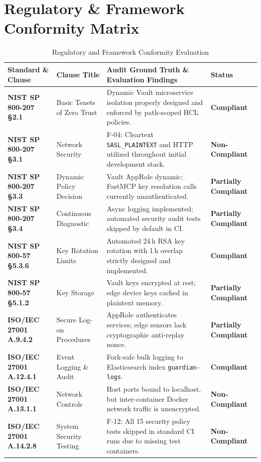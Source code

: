 \documentclass[10pt,a4paper]{report}
\begin{document}
\section{Regulatory \& Framework Conformity Matrix}

\begin{table}[htbp]
\centering
\small
\caption{Regulatory and Framework Conformity Evaluation}
\label{tab:conformity_matrix}
\begin{tabularx}{\textwidth}{llXl}
\toprule
\textbf{Standard \& Clause} & \textbf{Clause Title} & \textbf{Audit Ground Truth \& Evaluation Findings} & \textbf{Status} \\
\midrule
\textbf{NIST SP 800-207 \S2.1} & Basic Tenets of Zero Trust & Dynamic Vault microservice isolation properly designed and enforced by path-scoped HCL policies. & \textbf{Compliant} \\
\textbf{NIST SP 800-207 \S3.1} & Network Security & F-04: Cleartext \texttt{SASL\_PLAINTEXT} and HTTP utilized throughout initial development stack. & \textbf{Non-Compliant} \\
\textbf{NIST SP 800-207 \S3.3} & Dynamic Policy Decision & Vault AppRole dynamic; FastMCP key resolution calls currently unauthenticated. & \textbf{Partially Compliant} \\
\textbf{NIST SP 800-207 \S3.4} & Continuous Diagnostic & Async logging implemented; automated security audit tests skipped by default in CI. & \textbf{Partially Compliant} \\
\textbf{NIST SP 800-57 \S5.3.6} & Key Rotation Limits & Automated 24\,h RSA key rotation with 1\,h overlap strictly designed and implemented. & \textbf{Compliant} \\
\textbf{NIST SP 800-57 \S5.1.2} & Key Storage & Vault keys encrypted at rest; edge device keys cached in plaintext memory. & \textbf{Partially Compliant} \\
\textbf{ISO/IEC 27001 A.9.4.2} & Secure Log-on Procedures & AppRole authenticates services; edge sensors lack cryptographic anti-replay nonce. & \textbf{Partially Compliant} \\
\textbf{ISO/IEC 27001 A.12.4.1} & Event Logging \& Audit & Fork-safe bulk logging to Elasticsearch index \texttt{guardian-logs}. & \textbf{Compliant} \\
\textbf{ISO/IEC 27001 A.13.1.1} & Network Controls & Host ports bound to localhost, but inter-container Docker network traffic is unencrypted. & \textbf{Non-Compliant} \\
\textbf{ISO/IEC 27001 A.14.2.8} & System Security Testing & F-12: All 15 security policy tests skipped in standard CI runs due to missing test containers. & \textbf{Non-Compliant} \\

\end{tabularx}
\end{table}
\end{document}
